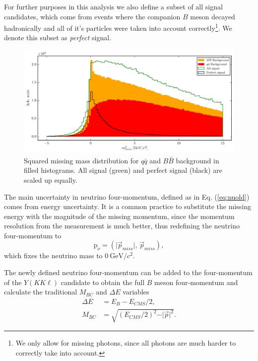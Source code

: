 \documentclass[oneside,a4paper,openany,12pt]{scrbook}
\newcommand {\e}[1]{\mathrm{~#1}}
\begin{document}
For further purposes in this analysis we also define a subset of all signal candidates, which come from events where the companion $B$ meson decayed hadronically and all of it's particles were taken into account correctly\footnote{We only allow for missing photons, since all photons are much harder to correctly take into account.}. We denote this subset as \textit{perfect} signal.

\begin{figure}[H]
\centering
\captionsetup{width=.8\linewidth}
\includegraphics[width=\linewidth]{fig/missM2}
\caption{Squared missing mass distribution for $q \bar q$ and $B \bar B$ background in filled histograms. All signal (green) and perfect signal (black) are scaled up equally.}
\label{fig:missm2}
\end{figure}

The main uncertainty in neutrino four-momentum, defined as in Eq. (\ref{eq:nuold}) comes from energy uncertainty. It is a common practice to substitute the missing energy with the magnitude of the missing momentum, since the momentum resolution from the measurement is much better, thus redefining the neutrino four-momentum to
\begin{equation}
\label{eq:nunew}
\mathrm{p}_\nu = \left(\vert \vec{p}_{miss} \vert,\,\vec{p}_{miss} \right),
\end{equation}
which fixes the neutrino mass to $0\e{GeV}/c^2$.

The newly defined neutrino four-momentum can be added to the four-momentum of the $Y(KK\ell)$ candidate to obtain the full $B$ meson four-momentum and calculate the traditional $M_{BC}$ and $\Delta E$ variables
\begin{align}
\label{eq:de}
\Delta E &= E_B - E_{CMS}/2,\\
M_{BC} &= \sqrt{\left(E_{CMS}/2\right)^2 - \vert \vec{p} \vert^2}.
\end{align}
\end{document}
